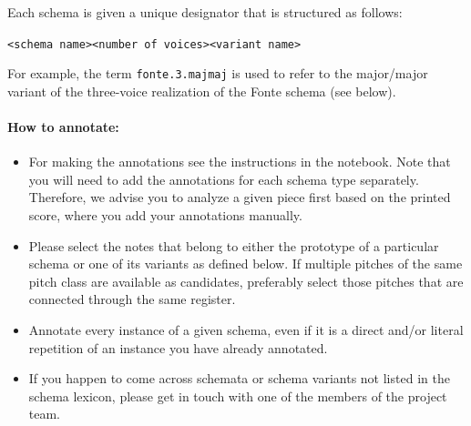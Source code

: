 \documentclass[11pt, openany]{article}
\begin{document}
Each schema is given a unique designator that is structured as follows:
\begin{center}
\texttt{<schema name><number of voices><variant name>}
\end{center}
For example, the term \texttt{fonte.3.majmaj} is used to refer to the major/major variant of the three-voice realization of the Fonte schema (see below).

\paragraph{How to annotate:\\}
\begin{itemize}
\item For making the annotations see the instructions in the notebook. Note that you will need to add the annotations for each schema type separately. Therefore, we advise you to analyze a given piece first based on the printed score, where you add your annotations manually.
\item Please select the notes that belong to either the prototype of a particular schema or one of its variants as defined below.
If multiple pitches of the same pitch class are available as candidates, preferably select those pitches that are connected through the same register.
\item Annotate every instance of a given schema, even if it is a direct and/or literal repetition of an instance you have already annotated.
\item If you happen to come across schemata or schema variants not listed in the schema lexicon, please get in touch with one of the members of the project team.
\end{itemize}
\end{document}
